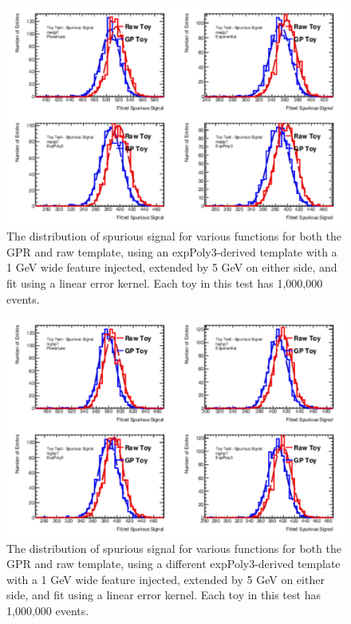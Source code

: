 \begin{figure} 
\begin{center}
  \includegraphics[width=\textwidth]{figures/background/gpr/validation/linear/ToyTest_FitSigVals_medpT_1M_Sig_1s}   
\caption{The distribution of spurious signal for various functions for both the GPR and raw template, using an expPoly3-derived template with a 1 GeV wide feature injected, extended by 5 GeV on either side, and fit using a linear error kernel. Each toy in this test has 1,000,000 events.}
\label{fig:linearkernel_medpt_1M_Sig_1s}
\end{center}
\end{figure}

\begin{figure} 
\begin{center}
  \includegraphics[width=\textwidth]{figures/background/gpr/validation/linear/ToyTest_FitSigVals_highpT_1M_Sig_1s}   
\caption{The distribution of spurious signal for various functions for both the GPR and raw template, using a different expPoly3-derived template with a 1 GeV wide feature injected, extended by 5 GeV on either side, and fit using a linear error kernel. Each toy in this test has 1,000,000 events.}
\label{fig:linearkernel_highpt_1M_Sig_1s}
\end{center}
\end{figure}


